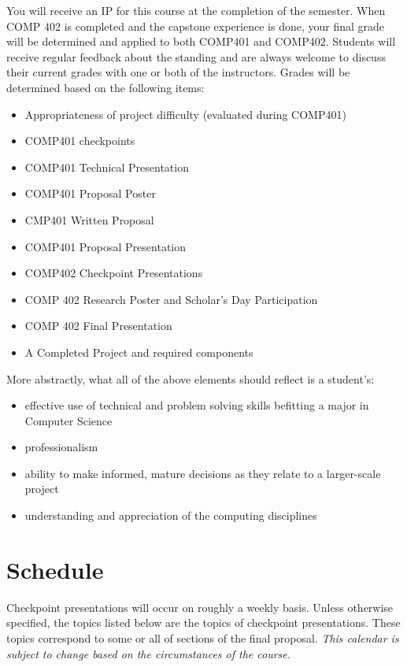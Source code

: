\documentclass[10pt]{article}
\begin{document}
You will receive an IP for this course at the completion of the semester. When COMP 402 is completed and the capstone experience is done, your final grade will be determined and applied to both COMP401 and COMP402. Students will receive regular feedback about the standing and are always welcome to discuss their current grades with one or both of the instructors. Grades will be determined based on the following items:
\begin{itemize}
\item Appropriateness of project difficulty (evaluated during COMP401) 
\item COMP401 checkpoints
\item COMP401 Technical Presentation
\item COMP401 Proposal Poster
\item CMP401 Written Proposal
\item COMP401 Proposal Presentation
\item COMP402 Checkpoint Presentations 
\item COMP 402 Research Poster and Scholar's Day Participation 
\item COMP 402 Final Presentation 
\item A Completed Project and required components
\end{itemize}

More abstractly, what all of the above elements should reflect is a student's: 
\begin{itemize}
\item effective use of technical and problem solving skills befitting a major in Computer Science
\item professionalism
\item ability to make informed, mature decisions as they relate to a larger-scale project
\item understanding and appreciation of the computing disciplines
\end{itemize}


\section{Schedule}

Checkpoint presentations will occur on roughly a weekly basis. Unless otherwise specified, the topics listed below are the topics of checkpoint presentations. These topics correspond to some or all of sections of the final proposal. \textit{This calendar is subject to change based on the circumstances of the course.}
\end{document}
